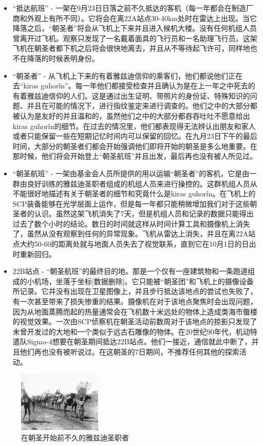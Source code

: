 \begin{itemize}
\item “抵达航班” - 一架在9月23日日落之前不久抵达的客机（每一年都会在制造厂商和外观上有所不同）。它将会在离22A站点30-40km处时在雷达上出现。当它降落之后，“朝圣者”将会从飞机上下来并且进入候机大楼。没有任何机组人员曾离开过飞机。观察只发现了一名戴着面具的飞行员和一名助理飞行员。这架飞机在朝圣者都下机之后将会很快地离去，并且从不等待起飞许可，同样地也不在降落的时候表明身份。
\item “朝圣者” - 从飞机上下来的有着雅兹迪信仰的乘客们，他们都说他们正在去“kiras guhorîn”。每一年他们都接受检查并且确认为是在上一年之中死去的有着雅兹迪信仰的人们。这是通过出生证明、带照片的身份证、特殊知识的问题、并且在可能的情况下，进行指纹鉴定来进行调查的。他们之中的大部分都被认为是友好的并且温和的，虽然他们之中的大部分都吞吞吐吐不愿意给出kiras guhorîn的细节。在过去的情况里，他们都表现得无法辨认出朋友和家人或者只能保留一些在短期记忆时间内可以保留的回忆。在九月23日下午的最后时间，大部分的朝圣者们都会开始强调他们即将开始的朝圣是多么地重要。在那时候，他们将会开始登上“朝圣航班”并且出发，最后再也没有被人所见过。
\item “朝圣航班” - 一架由基金会人员所提供的用以运输“朝圣者”的客机，它是由一群由良好训练的雅兹迪圣职者组成的机组人员来进行操控的。这群机组人员从不能很好地描述有关于朝圣者的细节和究竟什么是kiras guhorîn。在飞机上的SCP装备能够在光学层面上运作，但是每一年都只能稍微增加我们对于这些朝圣者的认识。虽然这架飞机消失了7天，但是机组人员和记录的数据只能得出过去了数个小时的结论。数日的时间就这样从时间计算工具和摄像机上消失了，虽然从没有观察到任何的异常现象。飞机从雷达上消失，并且在离22A站点大约50-60的距离处就与地面人员失去了视觉联系，直到它在10月1日的日出时重新回归。
\item 22B站点 - “朝圣航班”的最终目的地。那是一个仅有一座建筑物和一条跑道组成的小机场，坐落于坐标{[}数据删除]。它只能被“朝圣团”和飞机上的摄像设备所记录。它并没有出现在卫星图像上，并且步行抵达该地点的尝试也失败了，有一次甚至带来了损失惨重的结果。摄像机在对于该地点聚焦时会出现问题，因为从地面蒸腾而起的热量通常会在飞机数十米远处的物体上造成类海市蜃楼的视觉效果。一次由SCP侦察机在朝圣活动前数周对于该地点的掠影只发现了未曾开发过的大地和一个类似于远古石雕像的物体。在20世纪90年代，机动特遣队Sigma-4想要在朝圣期间抵达22B站点。他们一接近，通信就此中断了，并且他们再也没有被听说过。在这朝圣的7日期间，不推荐任何其他的探索活动。
\end{itemize}

\begin{figure}[H]
    \centering
    \includegraphics[width=0.3\linewidth]{images/SCP.036.2.jpg}
    \caption*{在朝圣开始前不久的雅兹迪圣职者}
\end{figure}

